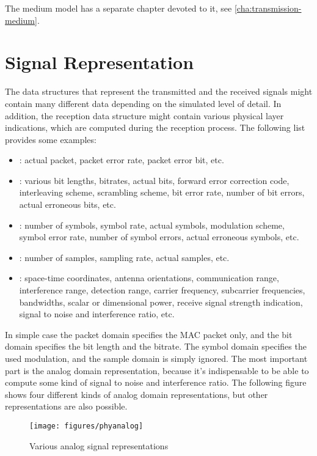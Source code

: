 The medium model has a separate chapter devoted to it, see \ref{cha:transmission-medium}.

\section{Signal Representation}

The data structures that represent the transmitted and the received signals
might contain many different data depending on the simulated level of detail. In
addition, the reception data structure might contain various physical layer
indications, which are computed during the reception process. The following list
provides some examples:

\begin{itemize}
  \item {}: actual packet, packet error rate, packet error bit,
etc.
  \item {}: various bit lengths, bitrates, actual bits, forward
error correction code, interleaving scheme, scrambling scheme, bit error rate,
number of bit errors, actual erroneous bits, etc.
  \item {}: number of symbols, symbol rate, actual symbols,
modulation scheme, symbol error rate, number of symbol errors, actual erroneous
symbols, etc.
  \item {}: number of samples, sampling rate, actual samples,
etc.
  \item {}: space-time coordinates, antenna orientations,
communication range, interference range, detection range, carrier frequency,
subcarrier frequencies, bandwidths, scalar or dimensional power, receive signal
strength indication, signal to noise and interference ratio, etc.
\end{itemize}

In simple case the packet domain specifies the MAC packet only, and the bit
domain specifies the bit length and the bitrate. The symbol domain specifies the
used modulation, and the sample domain is simply ignored. The most important
part is the analog domain representation, because it's indispensable to be able
to compute some kind of signal to noise and interference ratio. The following
figure shows four different kinds of analog domain representations, but other
representations are also possible.

\begin{figure}[h!]
\centering
\texttt{[image: figures/phyanalog]}
\caption{Various analog signal representations}
\end{figure}

